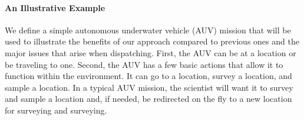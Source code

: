 \paragraph{An Illustrative Example} We define a simple autonomous
underwater vehicle (AUV) mission that will be used to illustrate the
benefits of our approach compared to previous ones and the major
issues that arise when dispatching. First, the AUV can be at a
location or be traveling to one. Second, the AUV has a few basic
actions that allow it to function within the environment.  It can go
to a location, survey a location, and sample a location. In a typical
AUV mission, the scientist will want it to survey and sample a
location and, if needed, be redirected on the fly to a new location for
surveying and surveying.

\begin{figure}[!htb]
  \centering
  \\

\end{figure}

